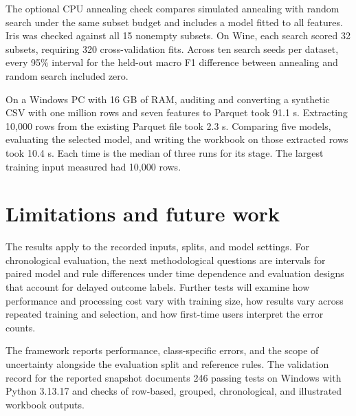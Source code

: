 \documentclass[10pt,a4paper]{article}
\begin{document}
The optional CPU annealing check compares simulated annealing with random search under the same subset budget and includes a model fitted to all features. Iris was checked against all 15 nonempty subsets. On Wine, each search scored 32 subsets, requiring 320 cross-validation fits. Across ten search seeds per dataset, every 95\% interval for the held-out macro F1 difference between annealing and random search included zero. \cite{annealing}

On a Windows PC with 16 GB of RAM, auditing and converting a synthetic CSV with one million rows and seven features to Parquet took 91.1 s. Extracting 10,000 rows from the existing Parquet file took 2.3 s. Comparing five models, evaluating the selected model, and writing the workbook on those extracted rows took 10.4 s. Each time is the median of three runs for its stage. The largest training input measured had 10,000 rows. \cite{benchmark}

\section{Limitations and future work}

The results apply to the recorded inputs, splits, and model settings. For chronological evaluation, the next methodological questions are intervals for paired model and rule differences under time dependence and evaluation designs that account for delayed outcome labels. Further tests will examine how performance and processing cost vary with training size, how results vary across repeated training and selection, and how first-time users interpret the error counts.

The framework reports performance, class-specific errors, and the scope of uncertainty alongside the evaluation split and reference rules. The validation record for the reported snapshot documents 246 passing tests on Windows with Python 3.13.17 and checks of row-based, grouped, chronological, and illustrated workbook outputs. \cite{milestone}
\end{document}
